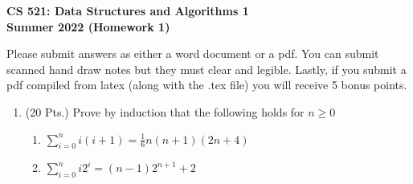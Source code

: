 
 

\oddsidemargin 0.15in
\textwidth 6.25in
\topmargin-0.85in
\textheight 9.0in
\headsep 0.6in


\begin{center}
\begin{LARGE}{\bf CS 521: Data Structures and Algorithms 1\\Summer
    2022 (Homework 1)} \end{LARGE}
\end{center}

Please submit answers as either a word document or a pdf.  You can submit scanned hand draw notes but they must clear and legible. Lastly, if you submit a pdf compiled from latex (along with the .tex file) you will receive 5 bonus points.

\begin{enumerate}
\item (20 Pts.)  Prove by induction that the following holds for $n \geq 0$
\begin{enumerate}
\item $\displaystyle\sum_{i=0}^{n}{i(i+1)} =\frac{1}{6} n(n+1)(2n+4)$ \\
 
\item $\displaystyle\sum_{i=0}^{n}{i 2^i} = (n-1) 2^{n+1} +2$ \\
\end{enumerate}
 


\end{enumerate}
